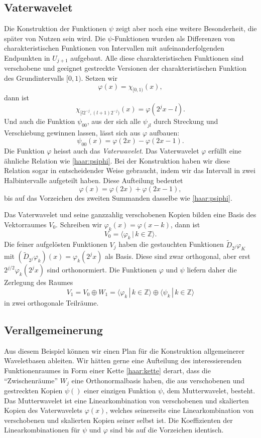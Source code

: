 \subsection{Vaterwavelet}
Die Konstruktion der Funktionen $\psi$ zeigt aber noch eine weitere 
Besonderheit, die später von Nutzen sein wird.
Die $\psi$-Funktionen wurden als Differenzen von charakteristischen
Funktionen von Intervallen mit aufeinanderfolgenden Endpunkten in $U_{j+1}$
aufgebaut.
Alle diese charakteristischen Funktionen sind verschobene und geeignet
gestreckte Versionen der charakteristischen Funktion des Grundintervalls
$[0,1)$.
Setzen wir
\[
\varphi(x) = \chi_{[0,1)} (x),
\]
dann ist
\[
\chi_{[l2^{-j},(l+1)2^{-j})}(x)
=
\varphi(2^jx-l).
\]
Und auch die Funktion $\psi_{00}$, aus der sich alle $\psi_{jl}$ durch
Streckung und Verschiebung gewinnen lassen, lässt sich aus $\varphi$
aufbauen:
\begin{equation}
\psi_{00}(x) = \varphi(2x) - \varphi(2x - 1).
\label{haar:psiphi}
\end{equation}
Die Funktion $\varphi$ heisst auch das {\em Vaterwavelet}.
Das Vaterwavelet $\varphi$ erfüllt eine ähnliche Relation
wie \eqref{haar:psiphi}.
Bei der Konstruktion haben wir diese Relation sogar in entscheidender
Weise gebraucht, indem wir das Intervall in zwei Halbintervalle aufgeteilt
haben.
Diese Aufteilung bedeutet
\[
\varphi(x) = \varphi(2x) + \varphi(2x-1),
\]
bis auf das Vorzeichen des zweiten Summanden dasselbe wie 
\eqref{haar:psiphi}.

Das Vaterwavelet und seine ganzzahlig verschobenen Kopien bilden
eine Basis des Vektorraumes $V_0$.
Schreiben wir $\varphi_k(x)=\varphi(x-k)$, dann ist
\[
V_0 = \langle \varphi_k\,|\, k\in\mathbb Z\rangle.
\]
Die feiner aufgelösten Funktionen $V_j$ haben die gestauchten Funktionen
$\tilde{D}_{2^j}\varphi_K$ mit
$(\tilde{D}_{2^j}\varphi_k)(x)=\varphi_k(2^jx)$ als Basis.
Diese sind zwar orthogonal, aber erst $2^{j/2}\varphi_k(2^jx)$ sind
orthonormiert.
Die Funktionen $\varphi$ und $\psi$ liefern daher die Zerlegung
des Raumes
\[
V_1
=
V_0 \oplus W_1
=
\langle \varphi_k\,|\,k\in\mathbb Z\rangle
\oplus
\langle \psi_k\,|\,k\in\mathbb Z\rangle
\]
in zwei orthogonale Teilräume.

\subsection{Verallgemeinerung}
Aus diesem Beispiel können wir einen Plan für die Konstruktion allgemeinerer
Waveletbasen ableiten.
Wir hätten gerne eine Aufteilung des interessierenden Funktionenraumes
in Form einer Kette \eqref{haar:kette} derart, dass die ``Zwischenräume''
$W_j$ eine Orthonormalbasis haben, die aus verschobenen und gestreckten
Kopien
$\psi()$
einer einzigen Funktion $\psi$, dem Mutterwavelet, besteht.
Das Mutterwavelet ist eine Linearkombination von verschobenen
und skalierten Kopien des Vaterwavelets $\varphi(x)$, welches seinerseits
eine Linearkombination von verschobenen und skalierten Kopien seiner
selbst ist.
Die Koeffizienten der Linearkombinationen für $\psi$ und $\varphi$ sind
bis auf die Vorzeichen identisch.




